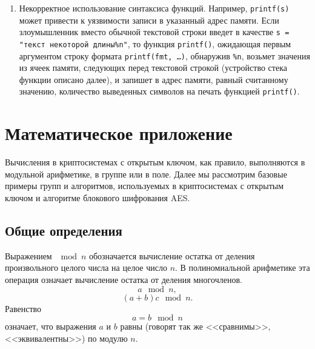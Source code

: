 \documentclass[10pt,a4paper]{book}
\begin{document}
\begin{enumerate}
\begin{enumerate}
        \end{enumerate}
    \item Некорректное использование синтаксиса функций. Например, \texttt{printf(s)} может привести к уязвимости записи в указанный адрес памяти. Если злоумышленник вместо обычной текстовой строки введет в качестве \texttt{s = "текст некоторой длины\%n"}, то функция \texttt{printf()}, ожидающая первым аргументом строку формата \texttt{printf(fmt, \dots)}, обнаружив \texttt{\%n}, возьмет значения из ячеек памяти, следующих перед текстовой строкой (устройство стека функции описано далее), и запишет в адрес памяти, равный считанному значению, количество выведенных символов на печать функцией \texttt{printf()}.
\end{enumerate}










\appendix

\chapter{Математическое приложение}
\label{chap:discrete-math}

Вычисления в криптосистемах с открытым ключом, как правило, выполняются в модульной арифметике, в группе или в поле. Далее мы рассмотрим базовые примеры групп и алгоритмов, используемых в криптосистемах с открытым ключом и алгоритме блокового шифрования AES.

\section*{Общие определения}

Выражением $\mod n$ обозначается вычисление остатка от деления произвольного целого числа на целое число $n$. В полиномиальной арифметике эта операция означает вычисление остатка от деления многочленов.
    \[ a\mod n, \]
    \[ (a + b) c\mod n. \]
Равенство
    \[ a = b \mod n \]
означает, что выражения $a$ и $b$ равны (говорят так же <<сравнимы>>, <<эквивалентны>>) по модулю $n$.
\end{document}
